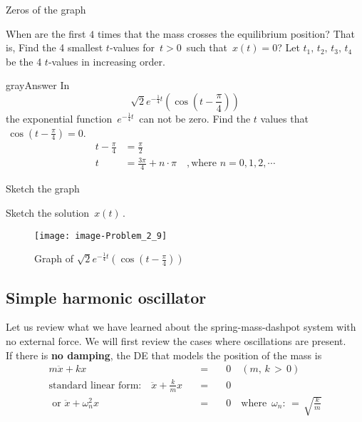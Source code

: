 \begin{problem}
  Zeros of the graph
\end{problem}
When are the first $4$ times that the mass crosses the equilibrium position?
That is, Find the 4 smallest $t$-values for $\, t>0\,$ such that $\, x(t)=0$?
Let $t_1,\, t_2,\, t_3,\, t_4\,$ be the 4 $t$-values in increasing order.
\begin{mybox}{gray}{Answer}
  In
  \begin{equation*}
    \sqrt{2} e^{-\frac{1}{4} t} \left( \cos (t - \frac{\pi}{4}) \right) 
  \end{equation*}
  the exponential function $\displaystyle \, e^{-\frac{1}{4} t} \,$
  can not be zero. Find the $t$ values that $\, \cos (t - \frac{\pi}{4}) = 0$.
  \begin{align*}
    t - \frac{\pi}{4} &= \frac{\pi}{2} \\
    t &= \frac{3 \pi}{4} + n \cdot \pi \quad , 
    \text{where } n = 0, 1, 2, \cdots 
  \end{align*}
\end{mybox}

\begin{problem}
  Sketch the graph  
\end{problem}
Sketch the solution $\, x(t)\,$.

\begin{figure}[ht!]
  \centering
  \texttt{[image: image-Problem\_2\_9]}    
  \caption{ Graph of $\displaystyle \sqrt{2}
    e^{-\frac{1}{4} t} \left( \cos (t - \frac{\pi}{4}) \right)$ }
\end{figure}
\clearpage

\subsection{Simple harmonic oscillator}

Let us review what we have learned about the spring-mass-dashpot system with no external force.
We will first review the cases where oscillations are present.\\

If there is \textbf{no damping}, the DE that models the position of the mass is
\begin{eqnarray*}
  m \ddot{x} + kx \quad &=& \quad 0 \quad (m,\, k \, > \,0)\\
  \text{standard linear form:} \quad \ddot{x} + \frac{k}{m} x \quad &=& \quad 0 \\
  \text{ or } \ddot{x} + \omega ^2 _n x \quad &=& \quad 0 \quad
                                                  \text{where } \, \omega _n : \, = \, \sqrt{\frac{k}{m}}
\end{eqnarray*}

